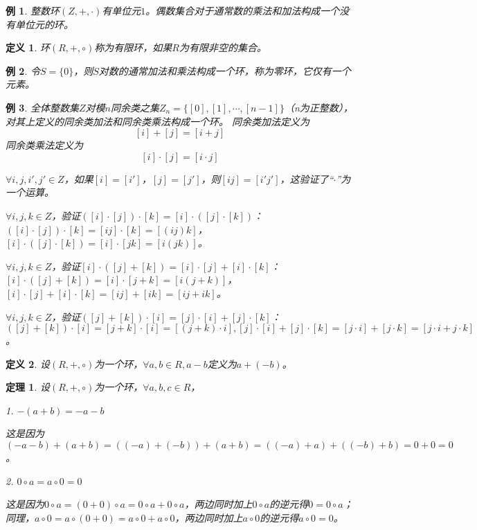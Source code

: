 \documentclass{article}
\newtheorem{Def}{定义}
\newtheorem{Thm}{定理}
\newtheorem*{Example}{例}
\begin{document}
\begin{CJK*}{UTF8}{gbsn}
  \begin{Example}
整数环$(Z,+,\cdot)$有单位元$1$。偶数集合对于通常数的乘法和加法构成一个没有单位元的环。
  \end{Example}

  \begin{Def}
    环$(R,+,\circ)$称为有限环，如果$R$为有限非空的集合。
  \end{Def}
  \begin{Example}
    令$S=\{0\}$，则$S$对数的通常加法和乘法构成一个环，称为零环，它仅有一个元素。
  \end{Example}
  \begin{Example}
    全体整数集$Z$对模$n$同余类之集$Z_n=\{[0],[1],\cdots,[n-1]\}$（n为正整数），对其上定义的同余类加法和同余类乘法构成一个环。
    同余类加法定义为
    \[[i]+[j]=[i+j]\]
    同余类乘法定义为
    \[[i]\cdot [j]=[i\cdot j]\]
  
    $\forall i,j,i',j'\in Z$，如果$[i]=[i']$，$[j]=[j']$，则$[ij]=[i'j']$，这验证了“$\cdot$”为一个运算。
  
    $\forall i,j,k\in Z$，验证$([i]\cdot [j])\cdot [k]=[i]\cdot ([j]\cdot [k])$：$([i]\cdot [j])\cdot [k]=[ij]\cdot [k]=[(ij)k]$，$[i]\cdot ([j]\cdot [k])=[i]\cdot [jk]=[i(jk)]$。
  
  $\forall i,j,k\in Z$，验证$[i]\cdot ([j]+[k])=[i]\cdot [j] + [i]\cdot [k]$：$[i]\cdot([j]+[k])=[i]\cdot[j+k]=[i(j+k)]$，$[i]\cdot [j]+[i]\cdot [k]=[ij]+[ik]=[ij+ik]$。
  
  $\forall i,j,k\in Z$，验证$([j]+[k])\cdot [i]=[j]\cdot [i]+[j]\cdot [k]$：$([j]+[k])\cdot [i]=[j+k]\cdot[i]=[(j+k)\cdot i],[j]\cdot [i]+[j]\cdot [k]=[j\cdot i]+[j\cdot k]=[j\cdot i+j\cdot k]$。
  
  \end{Example}
  \begin{Def}
    设$(R,+,\circ)$为一个环，$\forall a,b\in R,a-b$定义为$a+(-b)$。
  \end{Def}
  \begin{Thm}
    设$(R,+,\circ)$为一个环，$\forall a,b,c\in R$，
  
    1. $-(a+b)=-a-b$
  
    这是因为$(-a-b)+(a+b)=((-a)+(-b))+(a+b)=((-a)+a)+((-b)+b)=0+0=0$。
  
    2. $0\circ a = a\circ 0 = 0$
  
    这是因为$0\circ a = (0+0)\circ a=0\circ a+0\circ a$，两边同时加上$0\circ a$的逆元得$0=0\circ a$；同理，$a\circ 0=a\circ (0+0)=a\circ 0 + a\circ 0$，两边同时加上$a\circ 0$的逆元得$a\circ 0=0$。
  

\end{Thm}
\end{CJK*}
\end{document}
